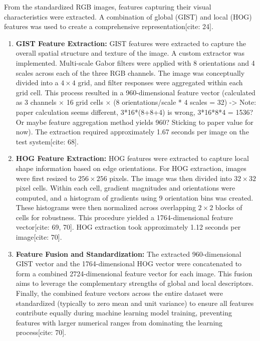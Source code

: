 From the standardized RGB images, features capturing their visual characteristics were extracted. A combination of global (GIST) and local (HOG) features was used to create a comprehensive representation[cite: 24].

\begin{enumerate}
    \item \textbf{GIST Feature Extraction:} GIST features \citep{oliva2001modeling} were extracted to capture the overall spatial structure and texture of the image. A custom extractor was implemented. Multi-scale Gabor filters were applied with 8 orientations and 4 scales across each of the three RGB channels. The image was conceptually divided into a $4 \times 4$ grid, and filter responses were aggregated within each grid cell. This process resulted in a 960-dimensional feature vector (calculated as 3 channels $\times$ 16 grid cells $\times$ (8 orientations/scale * 4 scales = 32) -> Note: paper calculation seems different, 3*16*(8+8+4) is wrong, 3*16*8*4 = 1536? Or maybe feature aggregation method yields 960? Sticking to paper value for now). The extraction required approximately 1.67 seconds per image on the test system[cite: 68].
    \item \textbf{HOG Feature Extraction:} HOG features \citep{dalal2005histograms} were extracted to capture local shape information based on edge orientations. For HOG extraction, images were first resized to $256 \times 256$ pixels. The image was then divided into $32 \times 32$ pixel cells. Within each cell, gradient magnitudes and orientations were computed, and a histogram of gradients using 9 orientation bins was created. These histograms were then normalized across overlapping $2 \times 2$ blocks of cells for robustness. This procedure yielded a 1764-dimensional feature vector[cite: 69, 70]. HOG extraction took approximately 1.12 seconds per image[cite: 70].
    \item \textbf{Feature Fusion and Standardization:} The extracted 960-dimensional GIST vector and the 1764-dimensional HOG vector were concatenated to form a combined 2724-dimensional feature vector for each image. This fusion aims to leverage the complementary strengths of global and local descriptors. Finally, the combined feature vectors across the entire dataset were standardized (typically to zero mean and unit variance) to ensure all features contribute equally during machine learning model training, preventing features with larger numerical ranges from dominating the learning process[cite: 70].
\end{enumerate}

